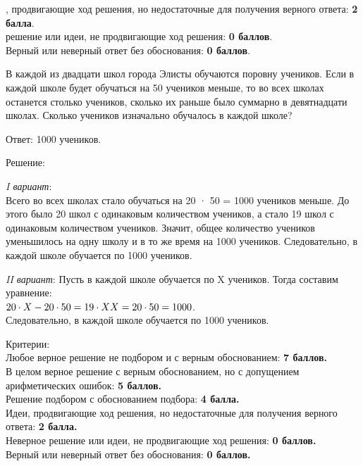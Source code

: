, продвигающие ход решения, но недостаточные для получения верного ответа: \textbf{2 балла}.\\
 решение или идеи, не продвигающие ход решения: \textbf{0 баллов}.\\
Верный или неверный ответ без обоснования: \textbf{0 баллов}.

\hspace{3mm}

 В каждой из двадцати школ города Элисты обучаются поровну учеников. Если в каждой школе будет обучаться на 50 учеников меньше, то во всех школах останется столько учеников, сколько их раньше было суммарно в девятнадцати школах. Сколько учеников изначально обучалось в каждой школе? 

\hspace{3mm}

Ответ: 1000 учеников.

Решение:\par
\textit{I вариант}: \\
Всего во всех школах стало обучаться на 20 · 50 = 1000 учеников меньше. До этого было 20 школ с одинаковым количеством учеников, а стало 19 школ с одинаковым количеством учеников. Значит, общее количество учеников уменьшилось на одну школу и в то же время на 1000 учеников. Следовательно, в каждой школе обучается по 1000 учеников.

\textit{II вариант}: Пусть в каждой школе обучается по X учеников. Тогда составим уравнение:\\$20\cdot X - 20\cdot50 = 19\cdot X\\
X = 20\cdot50 = 1000$. \\Следовательно, в каждой школе обучается по 1000 учеников.

\hspace{3mm}

Критерии:\\
Любое верное решение не подбором и с верным обоснованием: \textbf{7 баллов.}\\
В целом верное решение с верным обоснованием, но с допущением арифметических ошибок: \textbf{5 баллов.}\\
Решение подбором с обоснованием подбора: \textbf{4 балла.}\\
Идеи, продвигающие ход решения, но недостаточные для получения верного ответа: \textbf{2 балла.}\\
Неверное решение или идеи, не продвигающие ход решения: \textbf{0 баллов.} \\
Верный или неверный ответ без обоснования: \textbf{0 баллов.}

